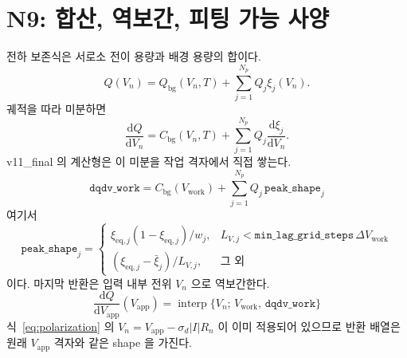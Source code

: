 \documentclass[11pt,a4paper]{article}
\newcommand{\dd}{\mathrm{d}}
\newcommand{\app}{\mathrm{app}}
\newcommand{\bg}{\mathrm{bg}}
\newcommand{\eq}{\mathrm{eq}}
\newcommand{\work}{\mathrm{work}}
\begin{document}
\section{N9: 합산, 역보간, 피팅 가능 사양}\label{sec:n9}
전하 보존식은 서로소 전이 용량과 배경 용량의 합이다.
\begin{equation}
Q(V_n)=Q_\bg(V_n,T)+\sum_{j=1}^{N_p}Q_j\xi_j(V_n).
\label{eq:chargev7}
\end{equation}
궤적을 따라 미분하면
\begin{equation}
\frac{\dd Q}{\dd V_n}=C_\bg(V_n,T)+\sum_{j=1}^{N_p}Q_j\frac{\dd\xi_j}{\dd V_n}.
\label{eq:sumgeneric}
\end{equation}
v11\_final 의 계산형은 이 미분을 작업 격자에서 직접 쌓는다.
\begin{equation}
\boxed{\;\texttt{dqdv\_work}
=C_\bg(V_{\work})+\sum_{j=1}^{N_p}Q_j\,\texttt{peak\_shape}_j\;}
\label{eq:dqdvwork}
\end{equation}
여기서
\begin{equation}
\texttt{peak\_shape}_j=
\begin{cases}
\xi_{\eq,j}(1-\xi_{\eq,j})/w_j,&
L_{V,j}<\texttt{min\_lag\_grid\_steps}\,\Delta V_{\work}\\[3pt]
(\xi_{\eq,j}-\bar\xi_j)/L_{V,j},&\text{그 외}
\end{cases}
\label{eq:peakchoice}
\end{equation}
이다. 마지막 반환은 입력 내부 전위 $V_n$ 으로 역보간한다.
\begin{equation}
\boxed{\;\frac{\dd Q}{\dd V_\app}(V_\app)
=\operatorname{interp}\{V_n;\,V_{\work},\,\texttt{dqdv\_work}\}\;}
\label{eq:interp}
\end{equation}
식~\eqref{eq:polarization} 의 $V_n=V_\app-\sigma_d|I|R_n$ 이 이미 적용되어 있으므로 반환 배열은 원래 $V_\app$ 격자와 같은 shape 을 가진다.
\end{document}
